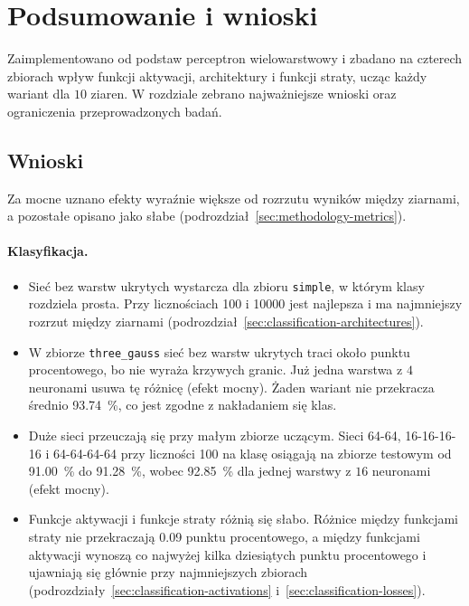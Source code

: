 \section{Podsumowanie i wnioski}
\label{sec:conclusions}

Zaimplementowano od podstaw perceptron wielowarstwowy i zbadano na czterech zbiorach wpływ funkcji aktywacji, architektury i funkcji straty, ucząc każdy wariant dla $10$ ziaren. W rozdziale zebrano najważniejsze wnioski oraz ograniczenia przeprowadzonych badań.

\subsection{Wnioski}
\label{sec:conclusions-findings}

Za mocne uznano efekty wyraźnie większe od rozrzutu wyników między ziarnami, a pozostałe opisano jako słabe (podrozdział~\ref{sec:methodology-metrics}).

\paragraph{Klasyfikacja.}
\begin{itemize}
    \item Sieć bez warstw ukrytych wystarcza dla zbioru \texttt{simple}, w którym klasy rozdziela prosta. Przy licznościach \num{100} i \num{10000} jest najlepsza i ma najmniejszy rozrzut między ziarnami (podrozdział~\ref{sec:classification-architectures}).
    \item W zbiorze \texttt{three\_gauss} sieć bez warstw ukrytych traci około punktu procentowego, bo nie wyraża krzywych granic. Już jedna warstwa z $4$ neuronami usuwa tę różnicę (efekt mocny). Żaden wariant nie przekracza średnio \qty{93.74}{\percent}, co jest zgodne z nakładaniem się klas.
    \item Duże sieci przeuczają się przy małym zbiorze uczącym. Sieci 64-64, 16-16-16-16 i 64-64-64-64 przy liczności \num{100} na klasę osiągają na zbiorze testowym od \qty{91.00}{\percent} do \qty{91.28}{\percent}, wobec \qty{92.85}{\percent} dla jednej warstwy z $16$ neuronami (efekt mocny).
    \item Funkcje aktywacji i funkcje straty różnią się słabo. Różnice między funkcjami straty nie przekraczają \num{0.09} punktu procentowego, a między funkcjami aktywacji wynoszą co najwyżej kilka dziesiątych punktu procentowego i ujawniają się głównie przy najmniejszych zbiorach (podrozdziały~\ref{sec:classification-activations} i~\ref{sec:classification-losses}).
\end{itemize}

